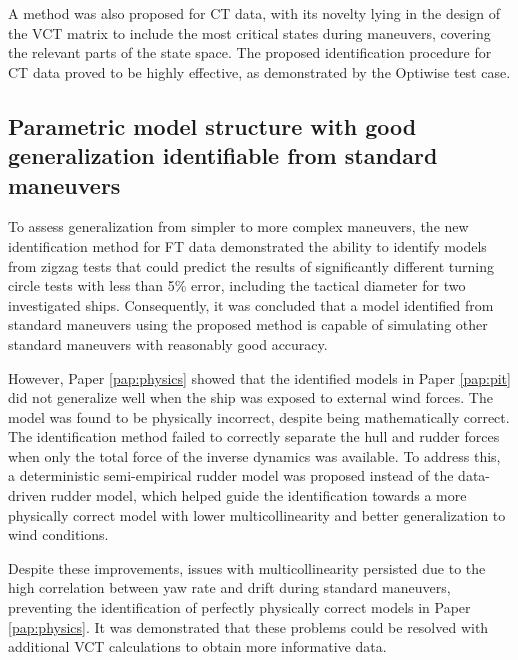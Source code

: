 A method was also proposed for CT data, with its novelty lying in the design of the VCT matrix to include the most critical states during maneuvers, covering the relevant parts of the state space. The proposed identification procedure for CT data proved to be highly effective, as demonstrated by the Optiwise test case.

\subsection*{Parametric model structure with good generalization identifiable from standard maneuvers}
To assess generalization from simpler to more complex maneuvers, the new identification method for FT data demonstrated the ability to identify models from zigzag tests that could predict the results of significantly different turning circle tests with less than 5\% error, including the tactical diameter for two investigated ships. Consequently, it was concluded that a model identified from standard maneuvers using the proposed method is capable of simulating other standard maneuvers with reasonably good accuracy.

However, Paper \ref{pap:physics} showed that the identified models in Paper \ref{pap:pit} did not generalize well when the ship was exposed to external wind forces. The model was found to be physically incorrect, despite being mathematically correct. The identification method failed to correctly separate the hull and rudder forces when only the total force of the inverse dynamics was available. To address this, a deterministic semi-empirical rudder model was proposed instead of the data-driven rudder model, which helped guide the identification towards a more physically correct model with lower multicollinearity and better generalization to wind conditions.

Despite these improvements, issues with multicollinearity persisted due to the high correlation between yaw rate and drift during standard maneuvers, preventing the identification of perfectly physically correct models in Paper \ref{pap:physics}. It was demonstrated that these problems could be resolved with additional VCT calculations to obtain more informative data.

